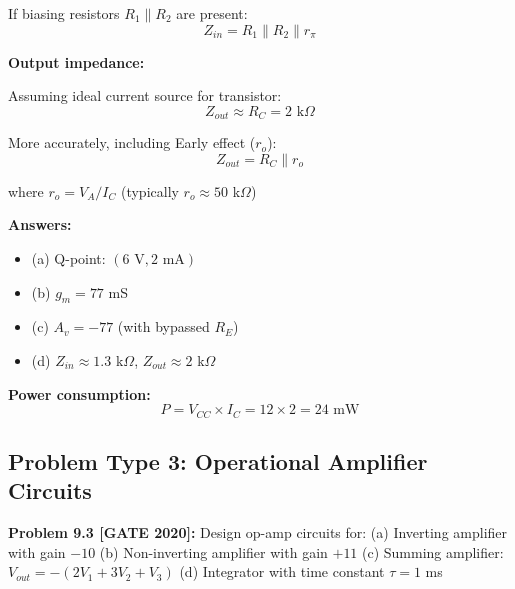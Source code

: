 \documentclass[12pt,a4paper]{article}
\begin{document}
\begin{solution}
If biasing resistors $R_1 \parallel R_2$ are present:
$$Z_{in} = R_1 \parallel R_2 \parallel r_{\pi}$$

\textbf{Output impedance:}

Assuming ideal current source for transistor:
$$Z_{out} \approx R_C = 2\text{ k}\Omega$$

More accurately, including Early effect ($r_o$):
$$Z_{out} = R_C \parallel r_o$$

where $r_o = V_A/I_C$ (typically $r_o \approx 50$ k$\Omega$)

\textbf{Answers:}
\begin{itemize}
    \item (a) Q-point: $(6\text{ V}, 2\text{ mA})$
    \item (b) $g_m = 77$ mS
    \item (c) $A_v = -77$ (with bypassed $R_E$)
    \item (d) $Z_{in} \approx 1.3$ k$\Omega$, $Z_{out} \approx 2$ k$\Omega$
\end{itemize}

\textbf{Power consumption:}
$$P = V_{CC} \times I_C = 12 \times 2 = 24\text{ mW}$$
\end{solution}

\subsection{Problem Type 3: Operational Amplifier Circuits}

\textbf{Problem 9.3 [GATE 2020]:} Design op-amp circuits for:
(a) Inverting amplifier with gain $-10$
(b) Non-inverting amplifier with gain $+11$
(c) Summing amplifier: $V_{out} = -(2V_1 + 3V_2 + V_3)$
(d) Integrator with time constant $\tau = 1$ ms
\end{document}
